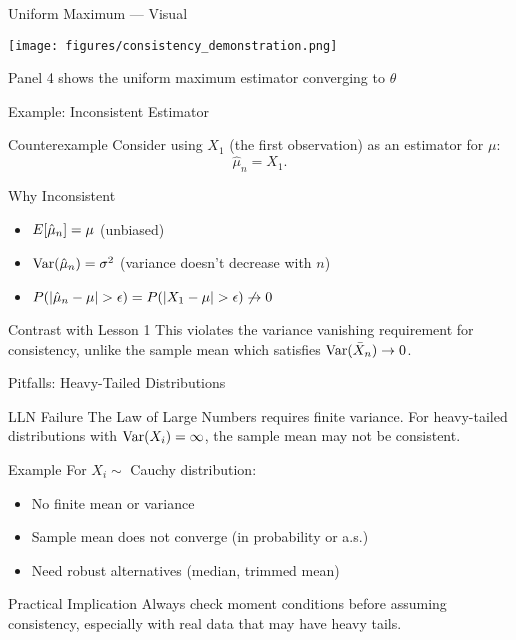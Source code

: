\begin{frame}{Uniform Maximum --- Visual}
  \begin{center}
    \texttt{[image: figures/consistency\_demonstration.png]}
  \end{center}
  \vspace{-0.3cm}
  \footnotesize Panel 4 shows the uniform maximum estimator converging to $\theta$
\end{frame}

\begin{frame}{Example: Inconsistent Estimator}
  \begin{block}{Counterexample}
    Consider using $X_1$ (the first observation) as an estimator for $\mu$:
    \[\hat{\mu}_n = X_1.\]
  \end{block}

  \begin{block}{Why Inconsistent}
    \begin{itemize}
      \item $\E[\hat{\mu}_n] = \mu$ (unbiased)
      \item $\Var(\hat{\mu}_n) = \sigma^2$ (variance doesn't decrease with $n$)
      \item $\P(|\hat{\mu}_n - \mu| > \epsilon) = \P(|X_1 - \mu| > \epsilon) \not\to 0$
    \end{itemize}
  \end{block}

  \begin{block}{Contrast with Lesson 1}
    This violates the variance vanishing requirement for consistency,
    unlike the sample mean which satisfies $\Var(\bar{X}_n) \to 0$.
  \end{block}
\end{frame}

\begin{frame}{Pitfalls: Heavy-Tailed Distributions}
  \begin{block}{LLN Failure}
    The Law of Large Numbers requires finite variance. For heavy-tailed
    distributions with $\Var(X_i) = \infty$, the sample mean may not be consistent.
  \end{block}

  \begin{block}{Example}
    For $X_i \sim$ Cauchy distribution:
    \begin{itemize}
      \item No finite mean or variance
      \item Sample mean does not converge (in probability or a.s.)
      \item Need robust alternatives (median, trimmed mean)
    \end{itemize}
  \end{block}

  \begin{block}{Practical Implication}
    Always check moment conditions before assuming consistency,
    especially with real data that may have heavy tails.
  \end{block}
\end{frame}

